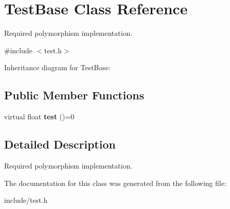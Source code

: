 \hypertarget{class_test_base}{}\section{Test\+Base Class Reference}
\label{class_test_base}


Required polymorphism implementation.  




{\ttfamily \#include $<$test.\+h$>$}



Inheritance diagram for Test\+Base\+:
\subsection*{Public Member Functions}
\begin{DoxyCompactItemize}
\item 
\mbox{\label{class_test_base_a56ede51bc088861f81b301fed7aab942}} 
virtual float {\bfseries test} ()=0
\end{DoxyCompactItemize}


\subsection{Detailed Description}
Required polymorphism implementation. 

The documentation for this class was generated from the following file\+:\begin{DoxyCompactItemize}
\item 
include/test.\+h\end{DoxyCompactItemize}
